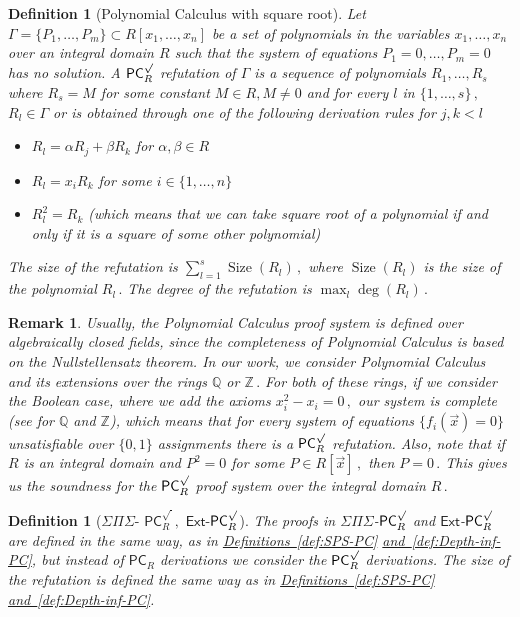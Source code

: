 \documentclass[11pt]{article}
\newcommand{\expref}[2]{\texorpdfstring{\hyperref[#2]{#1~\ref{#2}}}{#1~\ref{#2}}}
\newtheorem{definition}[theorem]{Definition}
\newtheorem{remark}[theorem]{Remark}
\newcommand{\Q}{{\mathbb Q}}
\newcommand{\Z}{{\mathbb Z}}
\DeclareMathOperator{\Size}{\mathrm{Size}}
\begin{document}
\begin{definition}[Polynomial Calculus with square root]\label{def:PCS}
Let $\Gamma = \{P_1, \ldots, P_m\} \subset R[x_1, \ldots, x_n]$ be a set of polynomials in the variables %
$x_1, \ldots, x_n$ %
 over an integral domain $R$ such that the system of equations $P_1 = 0, \ldots, P_m = 0$ has no solution. A $\mathsf{PC}^{\surd}_{R}$ refutation of $\Gamma$ is a sequence of polynomials $R_1, \ldots, R_s$ where $R_s = M$ for some constant $M \in R, M \neq 0$ and for every $l$ in %
$\{1, \ldots, s\}\,,$ %
 $R_l \in \Gamma$ or is obtained through one of the following derivation rules for $j, k < l$
\begin{itemize}
    \item $R_l = \alpha R_j + \beta R_k$ for $\alpha, \beta \in R$
    \item $R_l = x_i R_k$ for some $i \in \{1, \ldots, n\}$
    \item $R_l^2 = R_k$ (which means that we can take square root of a polynomial if and only if it is a square of some other polynomial)
\end{itemize}
The size of the refutation is %
$\sum_{l = 1}^s \Size(R_l)\,,$ %
 where $\Size(R_l)$ is the size of the polynomial %
$R_l\,.$ %
 The degree of the refutation is %
%
$\max_l \deg(R_l)\,.$ %
%
\end{definition}

\begin{remark}
Usually, the Polynomial Calculus proof system is defined over algebraically closed fields, since the completeness of Polynomial Calculus is based on the Nullstellensatz theorem. In our work, we consider Polynomial Calculus and its extensions over the rings $\Q$ or %
$\Z\,.$ %
 For both of these rings, if we consider the \emph{Boolean} case, where we add the axioms %
$x_i^2 - x_i = 0\,,$ %
 our system is complete (see \cite{CEI96, AGHT19_new} for $\Q$ and $\Z$), which means that for every system of equations $\{f_i(\vec x) = 0\}$ unsatisfiable over $\{0, 1\}$ %
assignments  %
there is a  $\mathsf{PC}^{\surd}_{R}$ refutation. Also, note that if $R$ is an integral domain and $P^2 = 0$ for some %
$P \in R[\vec x]\,,$ %
 then %
$P = 0\,.$ %
 This gives us the soundness for
the  %
$\mathsf{PC}^{\surd}_{R}$  proof system over the integral domain %
$R\,.$ %
\end{remark}


\begin{definition}[$\Sigma \Pi \Sigma$-%
$\mathsf{PC}_R^\surd\,,$ %
 $\mathsf{Ext}$-$\mathsf{PC}_{R}^\surd$]
The proofs in $\Sigma \Pi \Sigma$-$\mathsf{PC}_R^\surd$ and $\mathsf{Ext}$-$\mathsf{PC}_{R}^\surd$ are defined in the same way,
%
%
as in \expref{Definitions}{def:SPS-PC} \expref{and}{def:Depth-inf-PC}, %
but instead of $\mathsf{PC}_{R}$ derivations we consider the $\mathsf{PC}^{\surd}_{R}$ derivations. 
%
The size of the refutation is defined the same way as in
%
\expref{Definitions}{def:SPS-PC} \expref{and}{def:Depth-inf-PC}. %
\end{definition}
\end{document}

